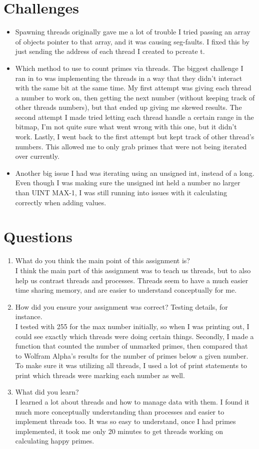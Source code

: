 \documentclass[fleqn,10pt,titlepage]{article}
\begin{document}
\section{Challenges}
\begin{itemize}
\item Spawning threads originally gave me a lot of trouble I tried passing an array of 
objects pointer to that array, and it was causing seg-faults. I fixed this by just sending 
the address of each thread I created to pcreate t.
\item Which method to use to count primes via threads. The biggest challenge I ran in to was
implementing the threads in a way that they didn't interact with the same bit at the same time.
My first attempt was giving each thread a number to work on, then getting the next number
(without keeping track of other threads numbers), but that ended up giving me skewed results.
The second attempt I made tried letting each thread handle a certain range in the bitmap, I'm
not quite sure what went wrong with this one, but it didn't work. Lastly, I went back to the
first attempt but kept track of other thread's numbers. This allowed me to only grab primes
that were not being iterated over currently.
\item Another big issue I had was iterating using an unsigned int, instead of a long. Even
though I was making sure the unsigned int held a number no larger than UINT MAX-1, I was 
still running into issues with it calculating correctly when adding values.
\end{itemize}
\clearpage

\section{Questions}
\begin{enumerate}
\item What do you think the main point of this assignment is? \\ I think the main part of this
assignment was to teach us threads, but to also help us contrast threads and processes. Threads
seem to have a much easier time sharing memory, and are easier to understand conceptually for me.
\item How did you ensure your assignment was correct? Testing details, for instance. \\ I 
tested with 255 for the max number initially, so when I was printing out, I could see exactly
which threads were doing certain things. Secondly, I made a function that counted the number of
unmarked primes, then compared that to Wolfram Alpha's results for the number of primes below a
given number. To make sure it was utilizing all threads, I used a lot of print statements to
print which threads were marking each number as well.
\item What did you learn? \\ I learned a lot about threads and how to manage data with them.
I found it much more conceptually understanding than processes and easier to implement threads
too. It was so easy to understand, once I had primes implemented, it took me only 20
minutes to get threads working on calculating happy primes.
\end{enumerate}
\end{document}
